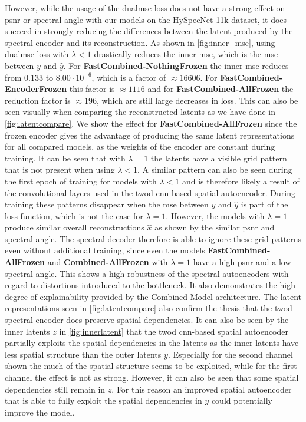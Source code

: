 However, while the usage of the \ac{dualmse} loss does not have a strong effect on \ac{psnr} or spectral angle with our models on the HySpecNet-11k dataset, it does succeed in strongly reducing the differences between the latent produced by the spectral encoder and its reconstruction. As shown in \autoref{fig:inner_mse}, using \ac{dualmse} loss with $\lambda < 1$ drastically reduces the inner \ac{mse}, which is the \ac{mse} between $y$ and $\hat{y}$. For \textbf{FastCombined-NothingFrozen} the inner \ac{mse} reduces from $0.133$ to $8.00\cdot 10^{-6}$, which is a factor of $\approx 16606$. For \textbf{FastCombined-EncoderFrozen} this factor is $\approx 1116$ and for \textbf{FastCombined-AllFrozen} the reduction factor is $\approx 196$, which are still large decreases in loss. This can also be seen visually when comparing the reconstructed latents as we have done in \autoref{fig:latentcompare}. We show the effect for \textbf{FastCombined-AllFrozen} since the frozen encoder gives the advantage of producing the same latent representations for all compared models, as the weights of the encoder are constant during training. It can be seen that with $\lambda=1$ the latents have a visible grid pattern that is not present when using $\lambda < 1$. A similar pattern can also be seen during the first epoch of training for models with $\lambda < 1$ and is therefore likely a result of the convolutional layers used in the \ac{twod} \ac{cnn}-based spatial autoencoder. During training these patterns disappear when the \ac{mse} between $y$ and $\hat{y}$ is part of the loss function, which is not the case for $\lambda=1$. However, the models with $\lambda=1$ produce similar overall reconstructions $\hat{x}$ as shown by the similar \ac{psnr} and spectral angle. The spectral decoder therefore is able to ignore these grid patterns even without additional training, since even the models \textbf{FastCombined-AllFrozen} and \textbf{Combined-AllFrozen} with $\lambda=1$ have a high \ac{psnr} and a low spectral angle. This shows a high robustness of the spectral autoencoders with regard to distortions introduced to the bottleneck. It also demonstrates the high degree of explainability provided by the Combined Model architecture. The latent representations seen in \autoref{fig:latentcompare} also confirm the thesis that the \ac{twod} spectral encoder does preserve spatial dependencies. It can also be seen by the inner latents $z$ in \autoref{fig:innerlatent} that the \ac{twod} \ac{cnn}-based spatial autoencoder partially exploits the spatial dependencies in the latents as the inner latents have less spatial structure than the outer latents $y$. Especially for the second channel shown the much of the spatial structure seems to be exploited, while for the first channel the effect is not as strong. However, it can also be seen that some spatial dependencies still remain in $z$. For this reason an improved spatial autoencoder that is able to fully exploit the spatial dependencies in $y$ could potentially improve the model.

